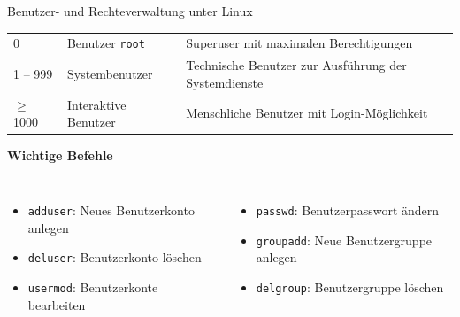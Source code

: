 {\begin{frame}[allowframebreaks]{Benutzer- und Rechteverwaltung unter Linux}
{\begin{tabularx}{\textwidth}{p{} p{} X}
            0 & Benutzer \texttt{root} & Superuser mit maximalen Berechtigungen \\
            1 -- 999 & Systembenutzer & Technische Benutzer zur Ausführung der Systemdienste \\
            $\geq$ 1000 & Interaktive Benutzer & Menschliche Benutzer mit Login-Möglichkeit \\
            \hline
        \end{tabularx}
    }

    \medskip
    \textbf{Wichtige Befehle}

    \begin{columns}[T, onlytextwidth]
        \begin{itemize}
            \item \texttt{adduser}: Neues Benutzerkonto anlegen
            \item \texttt{deluser}: Benutzerkonto löschen
            \item \texttt{usermod}: Benutzerkonte bearbeiten
        \end{itemize}

        \begin{itemize}
            \item \texttt{passwd}: Benutzerpasswort ändern
            \item \texttt{groupadd}: Neue Benutzergruppe anlegen
            \item \texttt{delgroup}: Benutzergruppe löschen
        \end{itemize}
    \end{columns}
\end{frame}
}






